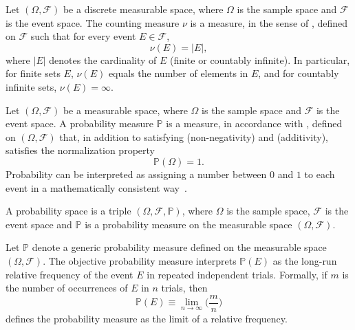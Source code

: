 \begin{definition}
	\label{def:counting_measure}
	Let $(\Omega, \mathcal{F})$ be a discrete measurable space, where $\Omega$ is the sample space and $\mathcal{F}$ is the event space. The counting measure $\nu$ is a measure, in the sense of , defined on $\mathcal{F}$ such that for every event $E \in \mathcal{F}$,
	\begin{equation}
		\nu(E) = |E|,
	\end{equation}
	where $|E|$ denotes the cardinality of $E$ (finite or countably infinite). In particular, for finite sets $E$, $\nu(E)$ equals the number of elements in $E$, and for countably infinite sets, $\nu(E) = \infty$.
\end{definition}

\begin{definition}
	\label{def:probability}
	Let $(\Omega, \mathcal{F})$ be a measurable space, where $\Omega$ is the sample space and $\mathcal{F}$ is the event space. A probability measure $\mathbb{P}$ is a measure, in accordance with , defined on $(\Omega, \mathcal{F})$ that, in addition to satisfying  (non-negativity) and  (additivity), satisfies the normalization property
	\begin{equation}
		\mathbb{P}(\Omega) = 1.
	\end{equation}
	Probability can be interpreted as assigning a number between $0$ and $1$ to each event in a mathematically consistent way~\cite{chan2021introduction}.
\end{definition}

\begin{definition}
	\label{def:probability_space}
	A probability space is a triple $(\Omega, \mathcal{F}, \mathbb{P})$, where $\Omega$ is the sample space,	$\mathcal{F}$ is the event space and $\mathbb{P}$ is a probability measure on the measurable space $(\Omega, \mathcal{F})$.
\end{definition}

\begin{definition}
	\label{def:objective_probability}
	Let $\mathbb{P}$ denote a generic probability measure defined on the measurable space $(\Omega, \mathcal{F})$.	The objective probability measure interprets $\mathbb{P}(E)$ as the long-run relative frequency of the event $E$ in repeated independent trials. Formally, if $m$ is the number of occurrences of $E$ in $n$ trials, then~\cite{Leamer1978}
	\begin{equation}
		\mathbb{P}(E) \equiv \lim_{{n \to \infty}} \bigg(\frac{m}{n}\bigg)
	\end{equation}
	defines the probability measure as the limit of a relative frequency.
\end{definition}

